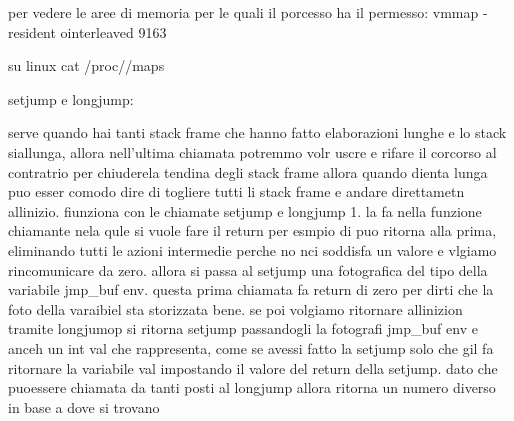 per vedere le aree di memoria per le quali il porcesso ha il permesso:
vmmap -resident ointerleaved 9163

su linux 
cat /proc/$$/maps


setjump e longjump:

serve quando hai tanti stack frame che hanno fatto elaborazioni lunghe e lo stack siallunga, allora nell'ultima chiamata potremmo volr uscre e rifare il corcorso al contratrio per chiuderela tendina degli stack frame allora quando dienta lunga puo esser comodo dire di togliere tutti li stack frame e andare direttametn allinizio. fiunziona con le chiamate setjump e longjump
1. la fa nella funzione chiamante nela qule si vuole fare il return per esmpio di puo ritorna alla prima, eliminando tutti le azioni intermedie perche no nci soddisfa un valore e vlgiamo rincomunicare da zero. allora si passa al setjump una fotografica del tipo della variabile jmp\_buf env. questa prima chiamata fa return di zero per dirti che la foto della varaibiel sta storizzata bene. se poi volgiamo ritornare allinizion tramite longjumop si ritorna setjump passandogli la fotografi jmp\_buf env e anceh un int val che rappresenta, come se avessi fatto la setjump solo che gil fa ritornare la variabile val impostando il valore del return della setjump. dato che puoessere chiamata da tanti posti al longjump allora ritorna un numero diverso in base a dove si trovano